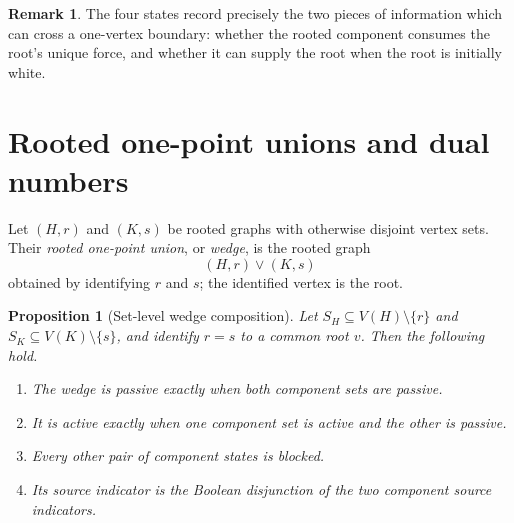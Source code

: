 \documentclass[11pt,reqno]{amsart}
\newtheorem{proposition}[proposition]{Proposition}
\theoremstyle{definition}
\newtheorem{remark}[remark]{Remark}
\begin{document}
\begin{remark}
The four states record precisely the two pieces of information which can cross
a one-vertex boundary: whether the rooted component consumes the root's unique
force, and whether it can supply the root when the root is initially white.
\end{remark}

\section{Rooted one-point unions and dual numbers}\label{sec:wedge}

Let $(H,r)$ and $(K,s)$ be rooted graphs with otherwise disjoint vertex sets.  Their \emph{rooted one-point union}, or \emph{wedge}, is the rooted graph
\[
  (H,r)\vee(K,s)
\]
obtained by identifying $r$ and $s$; the identified vertex is the root.

\begin{proposition}[Set-level wedge composition]\label{prop:wedge-set}
Let $S_H\subseteq V(H)\setminus\{r\}$ and
$S_K\subseteq V(K)\setminus\{s\}$, and identify $r=s$ to a common root $v$.
Then the following hold.
\begin{enumerate}[label=\textnormal{(\roman*)}]
\item The wedge is passive exactly when both component sets are passive.
\item It is active exactly when one component set is active and the other is passive.
\item Every other pair of component states is blocked.
\item Its source indicator is the Boolean disjunction of the two component source indicators.
\end{enumerate}
\end{proposition}
\end{document}
